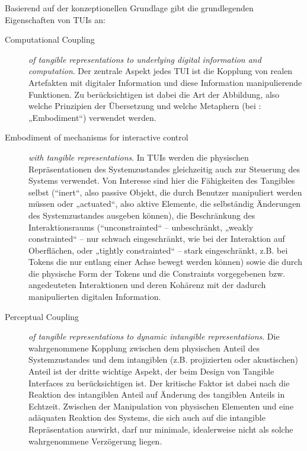 Basierend auf der konzeptionellen Grundlage gibt \citeauthor{Ishii08} die grundlegenden Eigenschaften von \glspl{TUI} an:
\begin{description}
	\item[Computational Coupling] \emph{of tangible representations to underlying digital information and computation}. Der zentrale Aspekt jedes \gls{TUI} ist die Kopplung von realen Artefakten mit digitaler Information und diese Information manipulierende Funktionen. Zu berücksichtigen ist dabei die Art der Abbildung, also welche Prinzipien der Übersetzung und welche Metaphern (bei \citeauthor{Ishii08}: „Embodiment“) verwendet werden.
	\item[Embodiment of mechanisms for interactive control] \emph{with tangible representations}. In \glspl{TUI} werden die physischen Repräsentationen des Systemzustandes gleichzeitig auch zur Steuerung des Systems verwendet. Von Interesse sind hier die Fähigkeiten des Tangibles selbst (“inert“, also passive Objekt, die durch Benutzer manipuliert werden müssen oder „actuated“, also aktive Elemente, die selbständig Änderungen des Systemzustandes ausgeben können), die Beschränkung des Interaktionsraums (“unconstrainted“ -- unbeschränkt, „weakly constrainted“ -- nur schwach eingeschränkt, wie bei der Interaktion auf Oberflächen, oder „tightly constrainted“ -- stark eingeschränkt, z.B. bei Tokens die nur entlang einer Achse bewegt werden können) sowie die durch die physische Form der Tokens und die Constraints vorgegebenen bzw. angedeuteten Interaktionen und deren Kohärenz mit der dadurch manipulierten digitalen Information.
	\item[Perceptual Coupling] \emph{of tangible representations to dynamic intangible representations}. Die wahrgenommene Kopplung zwischen dem physischen Anteil des Systemzustandes und dem intangiblen (z.B. projizierten oder akustischen) Anteil ist der dritte wichtige Aspekt, der beim Design von Tangible Interfaces zu berücksichtigen ist. Der kritische Faktor ist dabei nach \citeauthor{Ishii08} die Reaktion des intangiblen Anteil auf Änderung des tangiblen Anteils in Echtzeit. Zwischen der Manipulation von physischen Elementen und eine adäquaten Reaktion des Systems, die sich auch auf die intangible Repräsentation auswirkt, darf nur minimale, idealerweise nicht als solche wahrgenommene Verzögerung liegen. 
\end{description}

